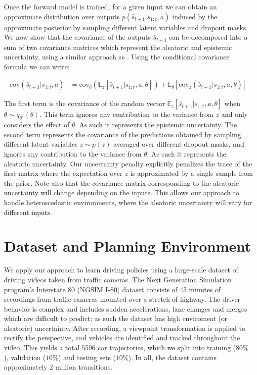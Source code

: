 \documentclass{article} %
\begin{document}
Once the forward model is trained, for a given input we can obtain an approximate distribution over outputs $p(\hat{s}_{t+1} | s_{1:t}, a)$ induced by the approximate posterior by sampling different latent variables and dropout masks.
We now show that the covariance of the outputs $\hat{s}_{t+1}$ can be decomposed into a sum of two covariance matrices which represent the aleatoric and epistemic uncertainty, using a similar approach as \citep{depeweg18}. 
Using the conditional covariance formula we can write:

\begin{align}
  \mbox{cov}(\hat{s}_{t+1} | s_{1:t}, a) &= \mbox{cov}_\theta(\mathbb{E}_z[\hat{s}_{t+1} | s_{1:t}, a, \theta]) + \mathbb{E}_\theta[\mbox{cov}_z(\hat{s}_{t+1} | s_{1:t}, a, \theta)]
\end{align}

The first term is the covariance of the random vector $\mathbb{E}_z[\hat{s}_{t+1} | s_{1:t}, a, \theta]$ when $\theta \sim q_{\theta^*}(\theta)$.
This term ignores any contribution to the variance from $z$ and only considers the effect of $\theta$. As such it represents the epistemic uncertainty.
The second term represents the covariance of the predictions obtained by sampling different latent variables $z \sim p(z)$ averaged over different dropout masks, and ignores any contribution to the variance from $\theta$. As such it represents the aleatoric uncertainty.
Our uncertainty penalty explicitly penalizes the trace of the first matrix where the expectation over $z$ is approximated by a single sample from the prior.
Note also that the covariance matrix corresponding to the aleatoric uncertainty will change depending on the inputs. This allows our approach to handle heteroscedastic environments, where the aleatoric uncertainty will vary for different inputs.




\section{Dataset and Planning Environment}
\label{dataset-and-planning}

We apply our approach to learn driving policies using a large-scale dataset of driving videos taken from traffic cameras.
The Next Generation Simulation program's Interstate 80 (NGSIM I-80) dataset \citep{NGSIM} consists of 45 minutes of recordings from traffic cameras mounted over a stretch of highway.
The driver behavior is complex and includes sudden accelerations, lane changes and merges which are difficult to predict; as such the dataset has high enviroment (or aleatoric) uncertainty.
After recording, a viewpoint transformation is applied to rectify the perspective, and vehicles are identified and tracked throughout the video.
This yields a total 5596 car trajectories, which we split into training ($80\%$), validation ($10\%$) and testing sets ($10\%$). In all, the dataset contains approximately 2 million transitions.
\end{document}
